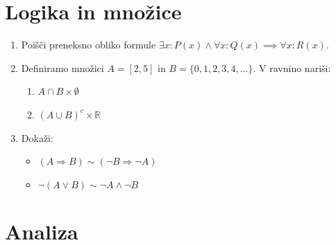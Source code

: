 \documentclass[a4paper,12pt]{article}
\begin{document}

\section*{Logika in množice}

\begin{enumerate}
\item
Poišči preneksno obliko formule \(\exists x : P(x) \land \forall x : Q(x) \implies \forall x : R(x) \).

\item
Definiramo množici \(A = [2,5]\) in \(B = \{0,1,2,3,4, \ldots\}\).
V ravnino nariši:
\begin{enumerate}
\item \(A \cap B \times \emptyset\)
\item \( (A \cup B)^c \times \mathbb{R}\)
\end{enumerate}

\item
Dokaži:
\begin{itemize}
\item \((A \Rightarrow B) \sim (\neg B \Rightarrow \neg A)\)
\item \(\neg (A \vee B) \sim \neg A \wedge \neg B \)
\end{itemize}
\end{enumerate}

\section*{Analiza}
\end{document}
